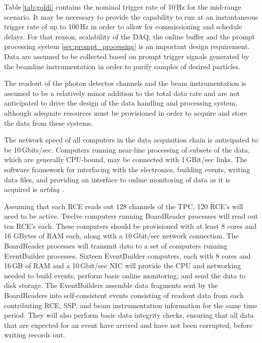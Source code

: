 

Table\,\ref{tab:goldi} contains the nominal trigger rate of 10\,Hz for
the mid-range scenario. It may be necessary to provide the capability
to run at  an instantaneous trigger rate of up to 100\,Hz in order to
allow for commissioning and schedule delays. For that reason,
scalability of the DAQ, the online buffer and the prompt processing system
\ref{sec:prompt_processing} is an important design requirement.
 Data are assumed to be
collected based on prompt trigger signals generated by the beamline
instrumentation in order to purify samples of desired particles.

The readout of the photon detector channels and the beam
instrumentation is assumed to be a relatively minor addition to the
total data rate and are not anticipated to drive the design of the
data handling and processing system, although adequate resources must
be provisioned in order to acquire and store the data from these
systems.

The network speed of all computers in the data acquisition
chain is anticipated to be 10\,Gbits/sec.  Computers running near-line
processing of subsets of the data, which are generally CPU-bound, may
be connected with 1\,GBit/sec links.  The software framework for
interfacing with the electronics, building events, writing data files,
and providing an interface to online monitoring of data as it is
acquired is {\it artdaq}~\cite{artdaq}.

Assuming that each RCE reads out 128 channels of the TPC, 120 RCE's
will need to be active.  Twelve computers running BoardReader
processes will read out ten RCE's each.  These computers should be
provisioned with at least 8 cores and 16 GBytes of RAM each, along
with a 10\,Gbit/sec network connection.  The BoardReader processes will
transmit data to a set of computers running EventBuilder processes.
Sixteen EventBuilder computers, each with 8 cores and 16\,GB of RAM
and a 10\,Gbit/sec NIC will provide the CPU and networking needed to
build events, perform basic online monitoring, and send the data to
disk storage.  The EventBuilders assemble data fragments sent by the
BoardReaders into self-consistent events consisting of readout data
from each contributing RCE, SSP, and beam instrumentation information
for the same time period.  They will also perform basic data integrity
checks, ensuring that all data that are expected for an event have
arrived and have not been corrupted, before writing records out.

